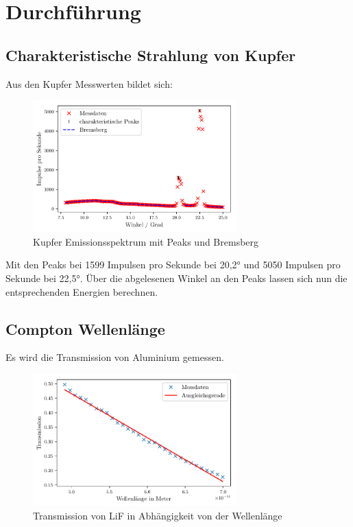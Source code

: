\section{Durchführung}
\label{sec:Durchfuehrung}
\subsection{Charakteristische Strahlung von Kupfer}
Aus den Kupfer Messwerten bildet sich:
\begin{figure}[H]
    \centering
    \includegraphics[width=0.7\textwidth]{plots/CU_Spektrum.pdf}
    \caption{Kupfer Emissionsspektrum mit Peaks und Bremsberg}
    \label{fig:CU_Spektrum}
\end{figure}
Mit den Peaks bei 1599 Impulsen pro Sekunde bei 20,2° und 5050 Impulsen pro Sekunde bei 22,5°.
Über die abgelesenen Winkel an den Peaks lassen sich nun die entsprechenden Energien berechnen.


\subsection{Compton Wellenlänge}
Es wird die Transmission von Aluminium gemessen.
\begin{figure}[H]
    \centering
    \includegraphics[width=0.7\textwidth]{plots/Transmission.pdf}
    \caption{Transmission von LiF in Abhängigkeit von der Wellenlänge}
    \label{fig:Transmission}
\end{figure}